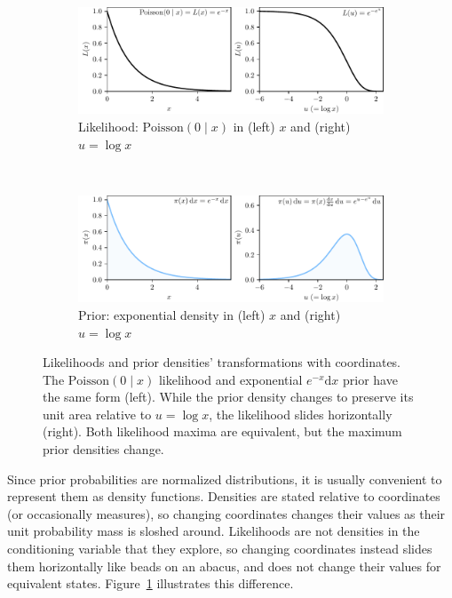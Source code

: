 \begin{figure}[tp]
\centering
\begin{subfigure}{\textwidth}
\centering
\includegraphics[width=\textwidth]{figures/searches_abacus_likelihood.pdf}
\caption{%
Likelihood: $\mathrm{Poisson}(0\mid x)$ in
(left) $x$ and
(right) $u = \log x$%
}
\end{subfigure}
\\[.5em]
\begin{subfigure}{\textwidth}
\centering
\includegraphics[width=\textwidth]{figures/searches_abacus_prior.pdf}
\caption{%
Prior: exponential density in
(left) $x$ and
(right) $u = \log x$%
}
\end{subfigure}
\caption[
Likelihoods and prior densities' transformations with coordinates.
]{%
Likelihoods and prior densities' transformations with coordinates.
The $\mathrm{Poisson}(0\mid x)$ likelihood and exponential $e^{-x}\mathrm{d}x$
prior have the same form (left).
While the prior density changes to preserve its unit area relative to
$u = \log x$,
the likelihood slides horizontally (right).
Both likelihood maxima are equivalent, but the maximum prior densities change.
}
\label{fig:searches_abacus}
\end{figure}

Since prior probabilities are normalized distributions, it is usually
convenient to represent them as density functions.
Densities are stated relative to coordinates (or occasionally measures),
so changing coordinates changes their values as their unit probability mass
is sloshed around.
Likelihoods are not densities in the conditioning variable that they explore,
so changing coordinates instead slides them horizontally like beads on an
abacus, and does not change their values for equivalent states.
Figure~\ref{fig:searches_abacus} illustrates this difference.

